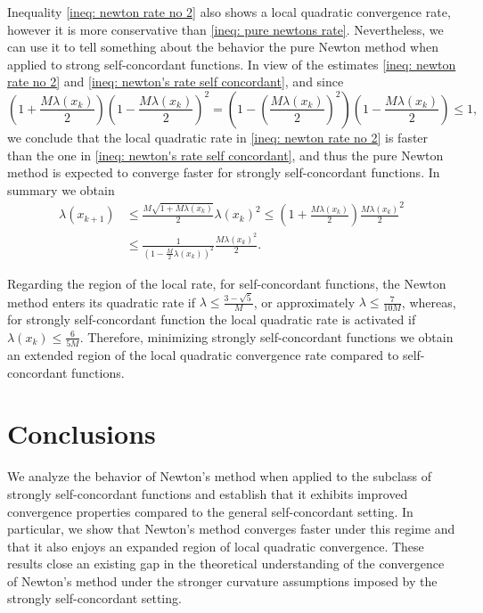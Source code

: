 \documentclass[sn-mathphys-num]{sn-jnl}%
\theoremstyle{thmstyleone}%
\theoremstyle{thmstyletwo}%
\theoremstyle{thmstylethree}%
\numberwithin{equation}{section}
\begin{document}
Inequality \eqref{ineq: newton rate no 2} also shows a local quadratic convergence rate, however it is more conservative than \eqref{ineq: pure newtons rate}. Nevertheless, we can use it to tell something about the behavior the pure Newton method when applied to strong self-concordant functions. In view of the estimates \eqref{ineq: newton rate no 2} and \eqref{ineq: newton's rate self concordant}, and since 
\begin{equation*}
    \left(1 + \frac{M\lambda(x_k)}{2} \right)    \left(1 - \frac{M\lambda(x_k)}{2} \right)^2 = \left(1 - \left(\frac{M\lambda(x_k)}{2}\right)^2 \right) \left(1 - \frac{M\lambda(x_k)}{2} \right) \leq 1,
\end{equation*}
we conclude that the local quadratic rate in \eqref{ineq: newton rate no 2} is faster than the one in \eqref{ineq: newton's rate self concordant}, and thus the pure Newton method is expected to converge faster for strongly self-concordant functions. In summary we obtain 
\begin{equation*}
\begin{split}
    \lambda(x_{k+1}) & \leq  \frac{M\sqrt{1 + M \lambda(x_{k})}}{2} \lambda(x_{k})^2 \leq \left(1 + \frac{M\lambda(x_k)}{2}\right) \frac{M \lambda(x_k)}{2}^2 \\ 
    & \leq \frac{1}{\left(1-\frac{M}{2}\lambda(x_{k})\right)^2} \frac{M\lambda(x_k)^2}{2}.
    \end{split}
\end{equation*}

Regarding the region of the local rate, for self-concordant functions, the Newton method enters its quadratic rate if $\lambda \leq \frac{3 - \sqrt{5}}{M}$, or approximately $\lambda \leq \frac{7}{10M}$, whereas, for strongly self-concordant function the local quadratic rate is activated if $\lambda(x_k) \leq \frac{6}{5M}$. Therefore, minimizing strongly self-concordant functions we obtain an extended region of the local quadratic convergence rate compared to self-concordant functions. 

\section{Conclusions}
We analyze the behavior of Newton’s method when applied to the subclass of strongly self-concordant functions and establish that it exhibits improved convergence properties compared to the general self-concordant setting. In particular, we show that Newton’s method converges faster under this regime and that it also enjoys an expanded region of local quadratic convergence.  These results close an existing gap in the theoretical understanding of the convergence of Newton’s method under the stronger curvature assumptions imposed by the strongly self-concordant setting.
\end{document}
